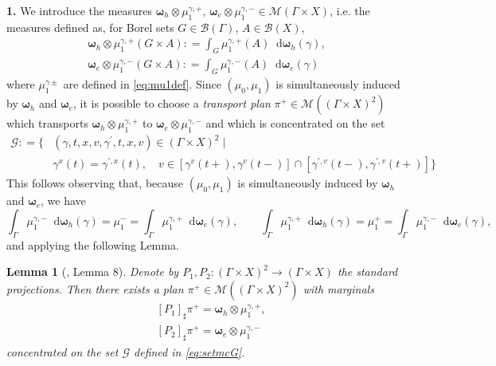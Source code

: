 \documentclass[11pt, twoside, reqno]{amsart}
\newtheorem{lemma}[thm]{Lemma}
\theoremstyle{definition}
\theoremstyle{remark}
\numberwithin{equation}{section}
\newcommand*\dif{\mathop{}\!\mathrm{d}}
\newcommand{\mc}[1]{\mathcal{#1}}
\newcommand{\bs}[1]{\boldsymbol{#1}}
\newcommand{\msc}[1]{\mathscr{#1}}
\begin{document}
\textbf{1.}  We introduce the measures  $\bs \omega_h \otimes \mu_1^{\gamma, +}$,  $\bs \omega_e \otimes \mu_1^{\gamma, -} \in \msc M(\Gamma \times X)$, i.e. the measures defined as, for Borel sets $G \in \mc B(\Gamma)$, $A \in \mc B(X)$, 
    \begin{equation}
    \begin{aligned}
        \bs \omega_h \otimes {\mu_1^{\gamma, +}}(G \times A) : = \int_{G}\mu_1^{\gamma, +}(A) \dif \bs \omega_h(\gamma), \\
         \bs \omega_e \otimes \mu_1^{\gamma, -} (G \times A) : = \int_{G}\mu_1^{\gamma, -}(A) \dif \bs \omega_e(\gamma)
         \end{aligned}
    \end{equation}
    where $\mu_1^{\gamma \pm}$ are defined in \eqref{eq:mu1def}.
    Since $(\mu_0, \mu_1)$ is simultaneously induced by $\bs \omega_h$ and $\bs \omega_e$, it is possible to choose a \textit{transport plan} $\pi^+ \in \msc M((\Gamma \times X )^2)$ which transports $\bs \omega_h \otimes \mu_1^{\gamma, +}$ to $\bs \omega_e \otimes \mu_1^{\gamma, -}$ and which is concentrated on the set
    \begin{equation}\label{eq:setmcG}
        \begin{aligned}
    \mc G : =  \Big\{&  (\gamma, t, x, v, \gamma^{\prime}, t, x, v) \in (\Gamma \times X )^2 \; \big|  \\
    & \gamma^x(t) = \gamma^{\prime, x}(t), \quad v \in [\gamma^v(t+), \gamma^v(t-)] \cap   [\gamma^{\prime,v}(t-),\gamma^{\prime,v}(t+)] \Big\}
            \end{aligned}
    \end{equation}
This follows observing that, because $(\mu_0, \mu_1)$ is simultaneously induced by $\bs \omega_h$ and $\bs \omega_e$,
we have
\begin{equation*}
    \int_{\Gamma}\mu_1^{\gamma, -}\dif \bs \omega_h(\gamma)=
    \mu_1^-=
     \int_{\Gamma}\mu_1^{\gamma, +}\dif \bs \omega_e(\gamma),
     \qquad
     \int_{\Gamma}\mu_1^{\gamma, +}\dif \bs \omega_h(\gamma)=
    \mu_1^+=
     \int_{\Gamma}\mu_1^{\gamma, -}\dif \bs \omega_e(\gamma),
\end{equation*}
and applying
the following Lemma. 
\begin{lemma}[\cite{marconi_burgers}, Lemma 8]
    Denote by $P_1, P_2: (\Gamma \times X)^2 \to (\Gamma \times X)$ the standard projections. Then there exists a plan $\pi^+ \in \msc M((\Gamma \times X)^2)$ with marginals 
    \begin{equation}
    \begin{aligned}
        & [P_1]_{\sharp} \pi^+ = \bs \omega_h \otimes \mu_1^{\gamma, +},\\
        & [P_2]_{\sharp} \pi^+ = \bs \omega_e \otimes \mu_1^{\gamma, -}
        \end{aligned}
    \end{equation}
    concentrated on the set $\mc G$ defined in  \eqref{eq:setmcG}.
\end{lemma}
\end{document}
